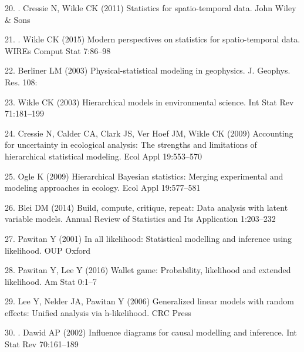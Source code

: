 \documentclass[10pt,letterpaper]{article}
\providecommand{\DIFaddtex}[1]{{\protect\color{blue} \sf #1}} %
\providecommand{\DIFdeltex}[1]{{\protect\color{red} \scriptsize #1}} %
\providecommand{\DIFaddbegin}{} %
\providecommand{\DIFaddend}{} %
\providecommand{\DIFdelbegin}{} %
\providecommand{\DIFdelend}{} %
\providecommand{\DIFadd}[1]{\texorpdfstring{\DIFaddtex{#1}}{#1}} %
\providecommand{\DIFdel}[1]{\texorpdfstring{\DIFdeltex{#1}}{}} %
\begin{document}
\hypertarget{ref-Cressie2011-sw}{}
\DIFdelbegin \DIFdel{20. }\DIFdelend \DIFaddbegin \DIFadd{23. }\DIFaddend Cressie N, Wikle CK (2011) Statistics for spatio-temporal data. John
Wiley \& Sons

\hypertarget{ref-Wikle2015-jq}{}
\DIFdelbegin \DIFdel{21. }\DIFdelend \DIFaddbegin \DIFadd{24. }\DIFaddend Wikle CK (2015) Modern perspectives on statistics for
spatio-temporal data. WIREs Comput Stat 7:86--98

\DIFdelbegin %
\DIFdel{22. Berliner LM (2003) Physical-statistical modeling in geophysics. J.
Geophys. Res. 108:
}%

\DIFdel{23. Wikle CK (2003) Hierarchical models in environmental science. Int
Stat Rev 71:181--199
}%

\DIFdel{24. Cressie N, Calder CA, Clark JS, Ver Hoef JM, Wikle CK (2009)
Accounting for uncertainty in ecological analysis: The strengths and
limitations of hierarchical statistical modeling. Ecol Appl 19:553--570
}%

\DIFdel{25. Ogle K (2009) Hierarchical Bayesian statistics: Merging experimental
and modeling approaches in ecology. Ecol Appl 19:577--581
}%

\DIFdel{26. Blei DM (2014) Build, compute, critique, repeat: Data analysis with
latent variable models. Annual Review of Statistics and Its Application
1:203--232
}%

\DIFdel{27. Pawitan Y (2001) In all likelihood: Statistical modelling and
inference using likelihood. OUP Oxford
}%

\DIFdel{28. Pawitan Y, Lee Y (2016) Wallet game: Probability, likelihood and
extended likelihood. Am Stat 0:1--7
}%

\DIFdel{29. Lee Y, Nelder JA, Pawitan Y (2006) Generalized linear models with
random effects: Unified analysis via h-likelihood. CRC Press
}%

\DIFdelend \hypertarget{ref-Dawid2002-ry}{}
\DIFdelbegin \DIFdel{30. }\DIFdelend \DIFaddbegin \DIFadd{25. }\DIFaddend Dawid AP (2002) Influence diagrams for causal modelling and
inference. Int Stat Rev 70:161--189
\end{document}
